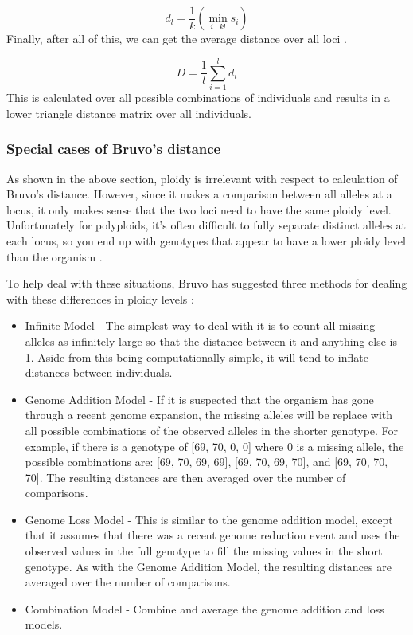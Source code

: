 \documentclass[letterpaper]{article}\usepackage[]{graphicx}\usepackage[]{color}
\begin{document}
\begin{equation}
\label{eq:d_l}
d_l = \frac{1}{k}\left(\min_{i \dotsc k!} s_i\right)
\end{equation}
\noindent
Finally, after all of this, we can get the average distance over all loci
\citep{Bruvo:2004}.

\begin{equation}
\label{eq:D}
D = \frac{1}{l}\sum_{i=1}^l d_i
\end{equation}
\noindent
This is calculated over all possible combinations of individuals and results in
a lower triangle distance matrix over all individuals.

\subsubsection{Special cases of Bruvo's distance}
\label{appendix:algorithm:bruvospecial}
As shown in the above section, ploidy is irrelevant with respect to
calculation of Bruvo's distance. However, since it makes a comparison between
all alleles at a locus, it only makes sense that the two loci need to have the
same ploidy level. Unfortunately for polyploids, it's often difficult to fully
separate distinct alleles at each locus, so you end up with genotypes that
appear to have a lower ploidy level than the organism \citep{Bruvo:2004}.

To help deal with these situations, Bruvo has suggested three methods for dealing
with these differences in ploidy levels \citep{Bruvo:2004}:
\begin{itemize}
  \item{Infinite Model -} The simplest way to deal with it is to count all
  missing alleles as infinitely large so that the distance between it and
  anything else is 1. Aside from this being computationally simple, it will tend
  to inflate distances between individuals.
  \item{Genome Addition Model -} If it is suspected that the organism has gone
  through a recent genome expansion, the missing alleles will be replace with
  all possible combinations of the observed alleles in the shorter genotype. For
  example, if there is a genotype of [69, 70, 0, 0] where 0 is a missing allele,
  the possible combinations are: [69, 70, 69, 69], [69, 70, 69, 70], and [69,
  70, 70, 70]. The resulting distances are then averaged over the number of
  comparisons.
  \item{Genome Loss Model -} This is similar to the genome addition model,
  except that it assumes that there was a recent genome reduction event and uses
  the observed values in the full genotype to fill the missing values in the
  short genotype. As with the Genome Addition Model, the resulting distances are
  averaged over the number of comparisons.
  \item{Combination Model -} Combine and average the genome addition and loss
  models.
\end{itemize}
\end{document}

